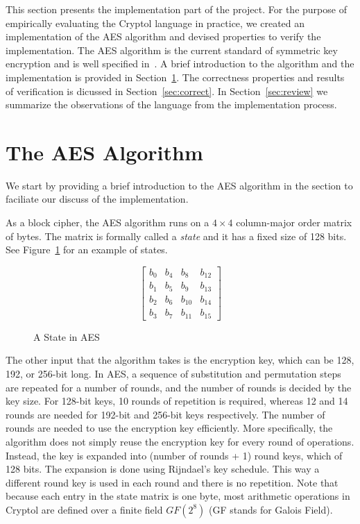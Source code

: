 \documentclass[a4paper, notitlepage]{report}
\begin{document}
This section presents the implementation part of the project. For the purpose of
empirically evaluating the Cryptol language in practice, we created an implementation
of the AES algorithm and devised properties to verify the implementation.
The AES algorithm is the current standard of symmetric key
encryption and is well specified in~\cite{standard2001announcing}. A brief introduction
to the algorithm and the implementation is provided in Section~\ref{sec:aes}.
The correctness properties and results of verification is dicussed in
Section~\ref{sec:correct}. In Section~\ref{sec:review} we summarize the observations
of the language from the implementation process. 

\section{The AES Algorithm}
\label{sec:aes}

We start by providing a brief introduction to the AES algorithm in the section
to faciliate our discuss of the implementation.

As a block cipher, the AES
algorithm runs on a $4 \times 4$ column-major order matrix of bytes.
The matrix is formally called a \emph{state} and it has a fixed size of 128 bits.
See Figure~\ref{fig:state} for an example of states.

\begin{figure}
  \begin{center}
    \begin{equation}
      \begin{bmatrix}
        b_0 & b_4 & b_8 & b_{12} \\
        b_1 & b_5 & b_9 & b_{13} \\
        b_2 & b_6 & b_{10} & b_{14} \\
        b_3 & b_7 & b_{11} & b_{15} 
      \end{bmatrix}
    \end{equation}
  \end{center}
  \caption{A State in AES}
  \label{fig:state}
\end{figure}

The other input that the algorithm takes is the encryption key, which can be 128, 192,
or 256-bit long. In AES, a sequence of substitution and permutation steps are repeated
for a number of rounds, and the number of rounds is decided by the key size.
For 128-bit keys, 10 rounds of repetition is required, whereas 12 and 14 rounds are
needed for 192-bit and 256-bit keys respectively. The number of rounds are needed
to use the encryption key efficiently. More specifically, the algorithm does not
simply reuse the encryption key for every round of operations. Instead, the key is
expanded into (number of rounds + 1) round keys, which of 128 bits. The expansion
is done using Rijndael's key schedule. This way a different round key is used in
each round and there is no repetition. Note that because each entry in the state
matrix is one byte, most arithmetic operations in Cryptol are defined over a finite
field $GF(2^8)$ (GF stands for Galois Field).
\end{document}
